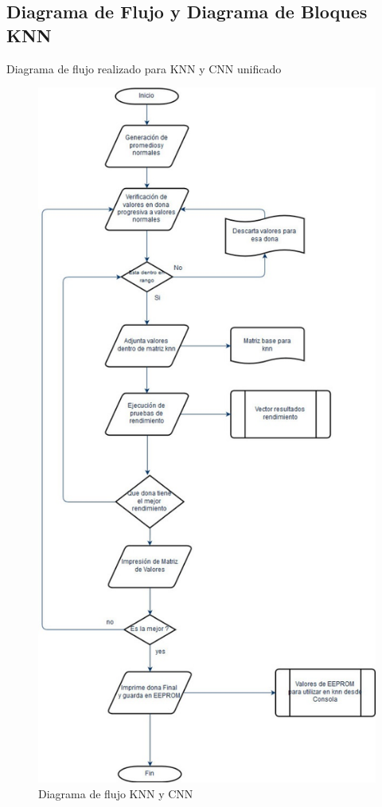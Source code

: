 \documentclass[10pt,a4paper]{article}
\begin{document}
\subsection{Diagrama de Flujo y Diagrama de Bloques KNN}
Diagrama de flujo realizado para KNN y CNN unificado
\begin{figure}[H]
\caption{Diagrama de flujo KNN y CNN} %
\centering
\includegraphics[scale=0.6]{Flujo.jpg} %
\end{figure}\\ %
\end{document}
